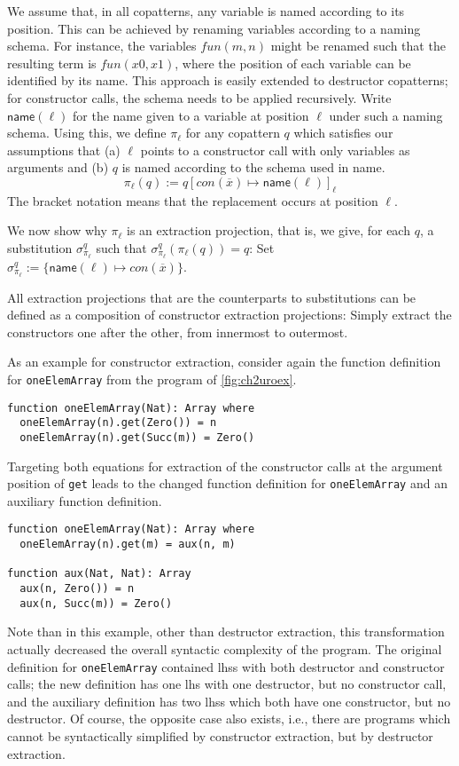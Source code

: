 We assume that, in all copatterns, any variable is named according to its position. This can be  achieved by renaming variables according to a naming schema. For instance, the variables $fun(m, n)$ might be renamed such that the resulting term is $fun(x0, x1)$, where the position of each variable can be identified by its name. This approach is easily extended to destructor copatterns; for constructor calls, the schema needs to be applied recursively. Write $\textsf{name}(\ell)$ for the name given to a variable at position $\ell$ under such a naming schema. Using this, we define $\pi_\ell$ for any copattern $q$ which satisfies our assumptions that (a) $\ell$ points to a constructor call with only variables as arguments and (b) $q$ is named according to the schema used in \textsf{name}.
\[
\pi_\ell(q) := q[con(\overline{x}) \mapsto \textsf{name}(\ell)]_\ell
\]
The bracket notation means that the replacement occurs at position $\ell$.

We now show why $\pi_\ell$ is an extraction projection, that is, we give, for each $q$, a substitution $\sigma^q_{\pi_\ell}$ such that $\sigma^q_{\pi_\ell}(\pi_\ell(q)) = q$: Set $\sigma^q_{\pi_\ell} := \{\textsf{name}(\ell) \mapsto con(\overline{x})\}$.

All extraction projections that are the counterparts to substitutions can be defined as a composition of constructor extraction projections: Simply extract the constructors one after the other, from innermost to outermost.

As an example for constructor extraction, consider again the function definition for \texttt{oneElemArray} from the program of \autoref{fig:ch2uroex}.
\begin{lstlisting}
function oneElemArray(Nat): Array where
  oneElemArray(n).get(Zero()) = n
  oneElemArray(n).get(Succ(m)) = Zero()
\end{lstlisting}
Targeting both equations for extraction of the constructor calls at the argument position of \texttt{get} leads to the changed function definition for \texttt{oneElemArray} and an auxiliary function definition.
\begin{lstlisting}
function oneElemArray(Nat): Array where
  oneElemArray(n).get(m) = aux(n, m)

function aux(Nat, Nat): Array
  aux(n, Zero()) = n
  aux(n, Succ(m)) = Zero()
\end{lstlisting}
Note than in this example, other than destructor extraction, this transformation actually decreased the overall syntactic complexity of the program. The original definition for \texttt{oneElemArray} contained lhss with both destructor and constructor calls; the new definition has one lhs with one destructor, but no constructor call, and the auxiliary definition has two lhss which both have one constructor, but no destructor. Of course, the opposite case also exists, i.e., there are programs which cannot be syntactically simplified by constructor extraction, but by destructor extraction.

